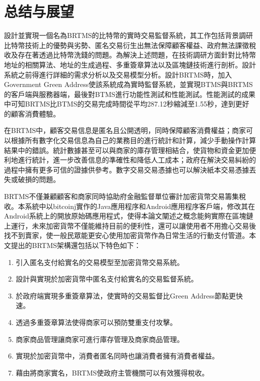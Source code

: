  
\chapter{总结与展望}
設計並實現一個名為BRTMS的比特幣的實時交易監督系統，其工作包括背景調研比特幣技術上的優勢與劣勢、匿名交易衍生出無法保障顧客權益、政府無法課徵稅收及存在著透過比特幣洗錢的問題。為解決上述問題，在技術調研方面針對比特幣地址的相關算法、地址的生成過程、多重簽章算法以及區塊鏈技術進行剖析。設計系統之前得進行詳細的需求分析以及交易模型分析。設計BRTMS時，加入Government Green Address使該系統成為實時監督系統，並實現BTMS與BRTMS的客戶端與服務器端，最後對BTMS進行功能性測試和性能測試。性能測試的成果中可知BRTMS比BTMS的交易完成時間從平均287.12秒縮減至1.55秒，達到更好的顧客消費體驗。

在BRTMS中，顧客交易信息是匿名且公開透明，同時保障顧客消費權益；商家可以根據所有數字化交易信息為自己的業務目的進行統計和計算，減少手動操作計算結果中的錯誤。統計數據甚至可以與商家的庫存管理相結合，使貨物和資金更加便利地進行統計，進一步改善信息的準確性和降低人工成本；政府在解決交易糾紛的過程中擁有更多可信的證據供參考。數字交易交易憑據也可以解決紙本交易憑據丟失或破損的問題。

BRTMS不僅兼顧顧客和商家同時協助府金融監督單位審計加密貨幣交易籌集稅收。本系統中以bitcoinj實作的Java應用程序和Android應用程序客戶端，修改其在Android系統上的開放原始碼應用程式，使得本論文闡述之概念能夠實際在區塊鏈上運行，未來加密貨幣不僅能維持目前的便利性，還可以讓使用者不用擔心交易後找不到賣家，使一般民眾能更安心使用加密貨幣作為日常生活的行動支付管道。本文提出的BRTMS架構還包括以下特色如下：

		\begin{enumerate}
			\item 引入匿名支付給實名的交易模型至加密貨幣交易系統。
			\item 設計與實現於加密貨幣中匿名支付給實名的交易監督系統。
			\item 於政府端實現多重簽章算法，使實時的交易監督比Green Address節點更快速。
			\item 透過多重簽章算法使得商家可以預防雙重支付攻擊。
			\item 商家商品管理讓商家可進行庫存管理及商家商品管理。
			\item 實現於加密貨幣中，消費者匿名同時也讓消費者擁有消費者權益。
			\item 藉由將商家實名，BRTMS使政府主管機關可以有效獲得稅收。
		\end{enumerate}

